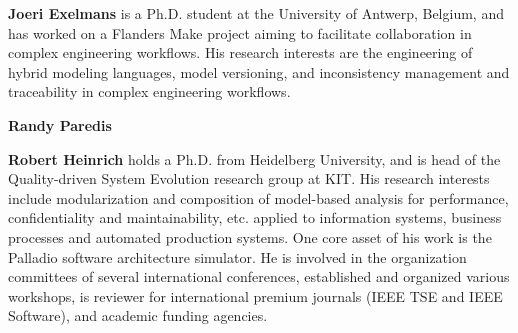 \medskip
\noindent
\textbf{Joeri Exelmans} is a Ph.D. student at the University of Antwerp, Belgium, and has worked on a Flanders Make project aiming to facilitate collaboration in complex engineering workflows. His research interests are the engineering of hybrid modeling languages, model versioning, and inconsistency management and traceability in complex engineering workflows.

\medskip
\noindent
\textbf{Randy Paredis} 


\medskip
\noindent
\textbf{Robert Heinrich} holds a Ph.D. from Heidelberg University, and is head of the Quality-driven System Evolution research group at KIT. His research interests include modularization
and composition of model-based analysis for performance, confidentiality and maintainability, etc. applied to information systems, business processes and automated production systems. One core asset of his work is the Palladio software architecture simulator. He is involved in the organization committees of several international conferences, established and organized various workshops, is reviewer for international premium journals (IEEE TSE and IEEE Software), and academic funding agencies.

